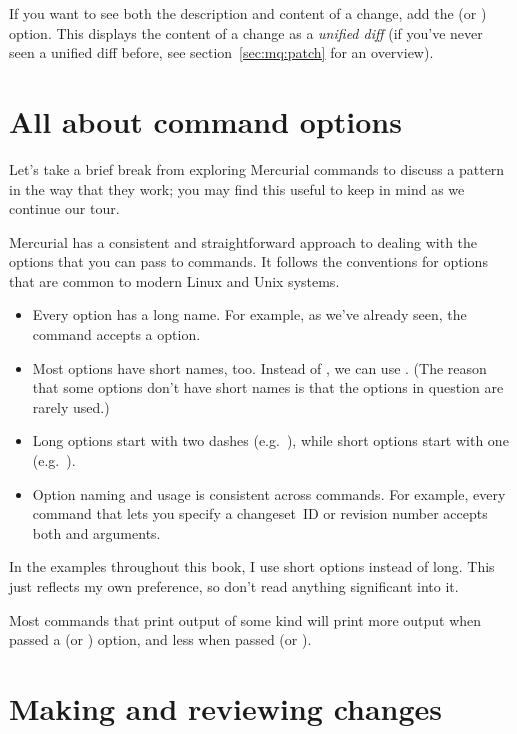 If you want to see both the description and content of a change, add
the  (or ) option.  This displays
the content of a change as a \emph{unified diff} (if you've never seen
a unified diff before, see section~\ref{sec:mq:patch} for an overview).

\section{All about command options}

Let's take a brief break from exploring Mercurial commands to discuss
a pattern in the way that they work; you may find this useful to keep
in mind as we continue our tour.

Mercurial has a consistent and straightforward approach to dealing
with the options that you can pass to commands.  It follows the
conventions for options that are common to modern Linux and Unix
systems.
\begin{itemize}
\item Every option has a long name.  For example, as we've already
  seen, the  command accepts a  option.
\item Most options have short names, too.  Instead of
  , we can use .  (The reason that
  some options don't have short names is that the options in question
  are rarely used.)
\item Long options start with two dashes (e.g.~),
  while short options start with one (e.g.~).
\item Option naming and usage is consistent across commands.  For
  example, every command that lets you specify a changeset~ID or
  revision number accepts both  and 
  arguments.
\end{itemize}
In the examples throughout this book, I use short options instead of
long.  This just reflects my own preference, so don't read anything
significant into it.

Most commands that print output of some kind will print more output
when passed a  (or ) option, and less
when passed  (or ).

\section{Making and reviewing changes}

